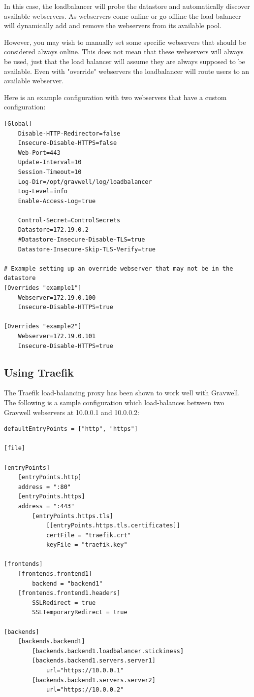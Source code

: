 In this case, the loadbalancer will probe the datastore and automatically
discover available webservers.  As webservers come online or go offline
the load balancer will dynamically add and remove the webservers from its
available pool.

However, you may wish to manually set some specific webservers that should
be considered always online.  This does not mean that these webservers will
always be used, just that the load balancer will assume they are always
supposed to be available.  Even with "override" webservers the loadbalancer
will route users to an available webserver.

Here is an example configuration with two webservers that have a custom configuration:

\begin{Verbatim}[breaklines=true]
[Global]
	Disable-HTTP-Redirector=false
	Insecure-Disable-HTTPS=false
	Web-Port=443
	Update-Interval=10
	Session-Timeout=10
	Log-Dir=/opt/gravwell/log/loadbalancer
	Log-Level=info
	Enable-Access-Log=true

	Control-Secret=ControlSecrets
	Datastore=172.19.0.2
	#Datastore-Insecure-Disable-TLS=true
	Datastore-Insecure-Skip-TLS-Verify=true

# Example setting up an override webserver that may not be in the datastore
[Overrides "example1"]
	Webserver=172.19.0.100
	Insecure-Disable-HTTPS=true

[Overrides "example2"]
	Webserver=172.19.0.101
	Insecure-Disable-HTTPS=true
\end{Verbatim}

\subsection{Using Traefik}
The Traefik load-balancing proxy has been shown to work well with
Gravwell. The following is a sample configuration which load-balances
between two Gravwell webservers at 10.0.0.1 and 10.0.0.2:

\begin{Verbatim}[breaklines=true]
defaultEntryPoints = ["http", "https"]

[file]

[entryPoints]
    [entryPoints.http]
    address = ":80"
    [entryPoints.https]
    address = ":443"
        [entryPoints.https.tls]
            [[entryPoints.https.tls.certificates]]
            certFile = "traefik.crt"
            keyFile = "traefik.key"

[frontends]
    [frontends.frontend1]
        backend = "backend1"
    [frontends.frontend1.headers]
        SSLRedirect = true
        SSLTemporaryRedirect = true

[backends]
    [backends.backend1]
        [backends.backend1.loadbalancer.stickiness]
        [backends.backend1.servers.server1]
            url="https://10.0.0.1"
        [backends.backend1.servers.server2]
            url="https://10.0.0.2"
\end{Verbatim}
